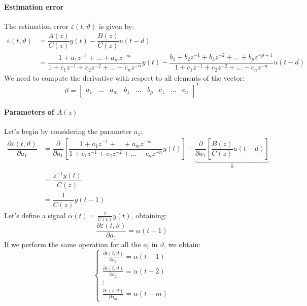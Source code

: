 \paragraph*{Estimation error}
The estimation error $\varepsilon(t,\vartheta)$ is given by:
\begin{align*}
    \varepsilon(t,\vartheta)    &=\dfrac{A(z)}{C(z)}y(t)-\dfrac{B(z)}{C(z)}u(t-d) \\
                                &=\dfrac{1+a_1z^{-1}+\dots+a_mz^{-m}}{1+c_1z^{-1}+c_2z^{-2}+\dots-c_nz^{-n}}y(t)-\dfrac{b_1+b_2z^{-1}+b_3z^{-2}+\dots+b_pz^{-p+1}}{1+c_1z^{-1}+c_2z^{-2}+\dots-c_nz^{-n}}u(t-d)
\end{align*}
We need to compute the derivative with respect to all elements of the vector: 
\[\vartheta=\begin{bmatrix}
    a_1 & \dots & a_m & b_1 & \dots & b_p & c_1 & \dots & c_n
\end{bmatrix}^T\]

\paragraph*{Parameters of $A(z)$}
Let's begin by considering the parameter $a_1$:
\begin{align*}
    \dfrac{\partial\varepsilon(t,\vartheta)}{\partial a_1}  &=\dfrac{\partial}{\partial a_1}\left[ \dfrac{1+a_1z^{-1}+\dots+a_mz^{-m}}{1+c_1z^{-1}+c_2z^{-2}+\dots-c_nz^{-n}}y(t)\right] - \underbrace{\dfrac{\partial}{\partial a_1}\left[\dfrac{B(z)}{C(z)}u(t-d)\right]}_0 \\        
                                                            &=\dfrac{z^{-1}y(t)}{C(z)} \\
                                                            &=\dfrac{1}{C(z)}y(t-1)
\end{align*}
Let's define a signal $\alpha(t)=\frac{1}{C(z)}y(t)$, obtaining:
\[\dfrac{\partial\varepsilon(t,\vartheta)}{\partial a_1}=\alpha(t-1)\]
If we perform the same operation for all the $a_i$ in $\vartheta$, we obtain:
\[\begin{cases}
    \frac{\partial\varepsilon(t,\vartheta)}{\partial a_1}=\alpha(t-1) \\
    \frac{\partial\varepsilon(t,\vartheta)}{\partial a_2}=\alpha(t-2) \\
    \vdots \\
    \frac{\partial\varepsilon(t,\vartheta)}{\partial a_m}=\alpha(t-m)
\end{cases}\]

